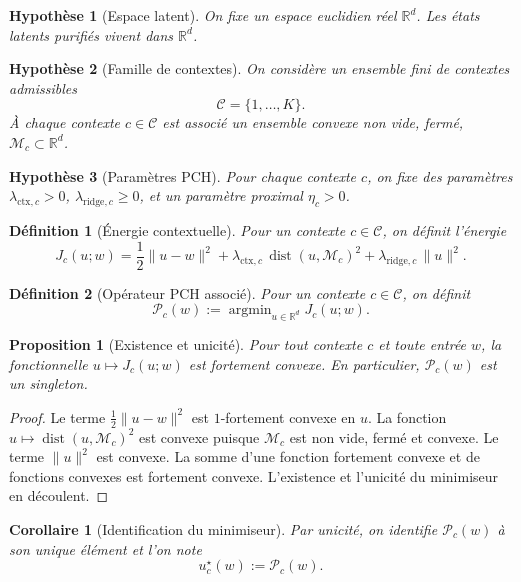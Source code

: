 \documentclass[11pt,a4paper]{article}
\newtheorem{definition}{Définition}[section]
\newtheorem{assumption}{Hypothèse}[section]
\newtheorem{proposition}{Proposition}[section]
\newtheorem{corollary}{Corollaire}[section]
\DeclareMathOperator{\argmin}{argmin}
\DeclareMathOperator{\dist}{dist}
\newcommand{\R}{\mathbb R}
\newcommand{\Mcal}{\mathcal M}
\newcommand{\Ccal}{\mathcal C}
\newcommand{\Pcal}{\mathcal P}
\begin{document}
\begin{assumption}[Espace latent]
On fixe un espace euclidien réel \(\R^d\). Les états latents purifiés vivent dans \(\R^d\).
\end{assumption}

\begin{assumption}[Famille de contextes]
On considère un ensemble fini de contextes admissibles
\[
\Ccal = \{1,\dots,K\}.
\]
À chaque contexte \(c\in\Ccal\) est associé un ensemble convexe non vide, fermé, \(\Mcal_c\subset\R^d\).
\end{assumption}

\begin{assumption}[Paramètres PCH]
Pour chaque contexte \(c\), on fixe des paramètres \(\lambda_{\mathrm{ctx},c}>0\), \(\lambda_{\mathrm{ridge},c}\ge 0\), et un paramètre proximal \(\eta_c>0\).
\end{assumption}

\begin{definition}[Énergie contextuelle]
Pour un contexte \(c\in\Ccal\), on définit l'énergie
\[
J_c(u;w)
=
\frac12\|u-w\|^2
+
\lambda_{\mathrm{ctx},c}\,\dist(u,\Mcal_c)^2
+
\lambda_{\mathrm{ridge},c}\,\|u\|^2.
\]
\end{definition}

\begin{definition}[Opérateur PCH associé]
Pour un contexte \(c\in\Ccal\), on définit
\[
\Pcal_c(w)
:=
\argmin_{u\in\R^d} J_c(u;w).
\]
\end{definition}

\begin{proposition}[Existence et unicité]
Pour tout contexte \(c\) et toute entrée \(w\), la fonctionnelle \(u\mapsto J_c(u;w)\) est fortement convexe. En particulier, \(\Pcal_c(w)\) est un singleton.
\end{proposition}

\begin{proof}
Le terme \(\frac12\|u-w\|^2\) est \(1\)-fortement convexe en \(u\). La fonction \(u\mapsto \dist(u,\Mcal_c)^2\) est convexe puisque \(\Mcal_c\) est non vide, fermé et convexe. Le terme \(\|u\|^2\) est convexe. La somme d'une fonction fortement convexe et de fonctions convexes est fortement convexe. L'existence et l'unicité du minimiseur en découlent.
\end{proof}

\begin{corollary}[Identification du minimiseur]
Par unicité, on identifie \(\Pcal_c(w)\) à son unique élément et l'on note
\[
u_c^\star(w):=\Pcal_c(w).
\]
\end{corollary}
\end{document}
